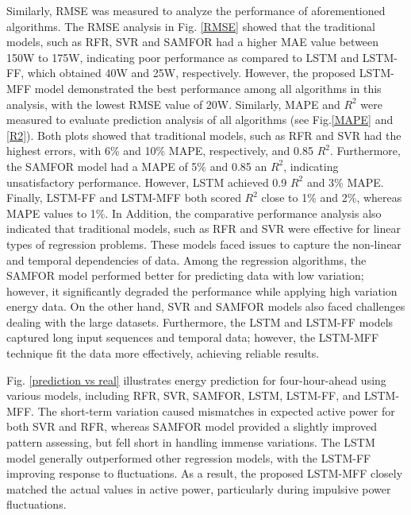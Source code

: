 \documentclass[journal]{IEEEtran}
\begin{document}
Similarly, RMSE was measured to analyze the performance of aforementioned algorithms. The RMSE analysis in Fig. \ref{RMSE} showed that the traditional models, such as RFR, SVR and SAMFOR had a higher MAE value between 150W to 175W, indicating poor performance as compared to LSTM and LSTM-FF, which obtained 40W and 25W, respectively. However, the proposed LSTM-MFF model demonstrated the best performance among all algorithms in this analysis, with the lowest RMSE value of 20W. 
 Similarly, MAPE and $R^2$ were measured to evaluate prediction analysis of all algorithms (see Fig.\ref{MAPE} and \ref{R2}). Both plots showed that traditional models, such as RFR and SVR had the highest errors, with 6\% and 10\% MAPE, respectively, and 0.85 \(R^2\). Furthermore, the SAMFOR model had a MAPE of 5\% and 0.85 an \(R^2\), indicating unsatisfactory performance.
 However, LSTM achieved 0.9 $R^2$ and 3\% MAPE. Finally, LSTM-FF and LSTM-MFF both scored $R^2$ close to 1\% and 2\%, whereas MAPE values to 1\%. 
 In Addition, the comparative performance analysis also indicated that traditional models, such as RFR and SVR were effective for linear types of regression problems. These models faced issues to capture the non-linear and temporal dependencies of data. 
 Among the regression algorithms, the SAMFOR model performed better for predicting data with low variation; however, it significantly degraded the performance while applying high variation energy data. On the other hand, SVR and SAMFOR models also faced challenges dealing with the large datasets. Furthermore, the LSTM and LSTM-FF models captured long input sequences and temporal data; however, the LSTM-MFF technique fit the data more effectively, achieving reliable results. 
 
 
 Fig. \ref{prediction vs real} illustrates energy prediction for four-hour-ahead using various models, including RFR, SVR, SAMFOR, LSTM, LSTM-FF, and LSTM-MFF. The short-term variation caused mismatches in expected active power for both SVR and RFR, whereas SAMFOR model provided a slightly improved pattern assessing, but fell short in handling immense variations. The LSTM model generally outperformed other regression models, with the LSTM-FF improving response to fluctuations. As a result, the proposed LSTM-MFF closely matched the actual values in active power, particularly during impulsive power fluctuations.
 
\end{document}

